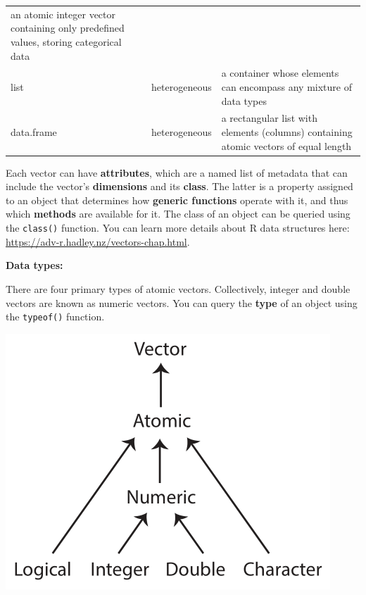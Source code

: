 \documentclass[
]{book}
\begin{document}
\begin{longtable}[]{@{}lll@{}}
\begin{minipage}[t]{0.71\columnwidth}
an atomic integer vector containing only predefined values, storing categorical data\strut
\end{minipage}\tabularnewline
\begin{minipage}[t]{0.10\columnwidth}\raggedright
list\strut
\end{minipage} & \begin{minipage}[t]{0.10\columnwidth}\raggedright
heterogeneous\strut
\end{minipage} & \begin{minipage}[t]{0.71\columnwidth}\raggedright
a container whose elements can encompass any mixture of data types\strut
\end{minipage}\tabularnewline
\begin{minipage}[t]{0.10\columnwidth}\raggedright
data.frame\strut
\end{minipage} & \begin{minipage}[t]{0.10\columnwidth}\raggedright
heterogeneous\strut
\end{minipage} & \begin{minipage}[t]{0.71\columnwidth}\raggedright
a rectangular list with elements (columns) containing atomic vectors of equal length\strut
\end{minipage}\tabularnewline
\bottomrule
\end{longtable}

Each vector can have \textbf{attributes}, which are a named list of metadata that can include the vector's \textbf{dimensions} and its \textbf{class}. The latter is a property assigned to an object that determines how \textbf{generic functions} operate with it, and thus which \textbf{methods} are available for it. The class of an object can be queried using the \texttt{class()} function. You can learn more details about R data structures here: \url{https://adv-r.hadley.nz/vectors-chap.html}.

\textbf{Data types:}

There are four primary types of atomic vectors. Collectively, integer and double vectors are known as numeric vectors. You can query the \textbf{type} of an object using the \texttt{typeof()} function.

\includegraphics{R/RDataWrangling/images/summary_tree_atomic.png}
\end{document}
